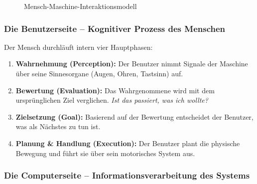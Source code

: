 \documentclass[12pt, a4paper]{article}
\begin{document}
\begin{figure}[H]
{%
}
\caption{Mensch-Maschine-Interaktionsmodell}
\end{figure}

\subsubsection{Die Benutzerseite -- Kognitiver Prozess des Menschen}

Der Mensch durchläuft intern vier Hauptphasen:

\begin{enumerate}
  \item \textbf{Wahrnehmung (Perception):} Der Benutzer nimmt Signale der Maschine
        über seine Sinnesorgane (Augen, Ohren, Tastsinn) auf.
  \item \textbf{Bewertung (Evaluation):} Das Wahrgenommene wird mit dem ursprünglichen
        Ziel verglichen. \textit{\glqq{}Ist das passiert, was ich wollte?\grqq{}}
  \item \textbf{Zielsetzung (Goal):} Basierend auf der Bewertung entscheidet der
        Benutzer, was als Nächstes zu tun ist.
  \item \textbf{Planung \& Handlung (Execution):} Der Benutzer plant die physische
        Bewegung und führt sie über sein motorisches System aus.
\end{enumerate}

\subsubsection{Die Computerseite -- Informationsverarbeitung des Systems}
\end{document}
